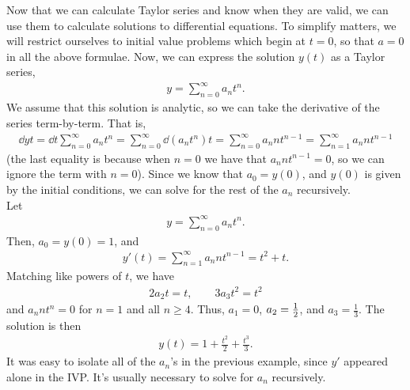 \documentclass{book}
\begin{document}
Now that we can calculate Taylor series and know when they are valid, we
can use them to calculate solutions to differential equations. To simplify
matters, we will restrict ourselves to initial value problems
which begin at $t=0$, so that $a=0$ in all the above formulae. Now, we can
express the solution $y(t)$ as a Taylor series,
\begin{align*}
y = \sum_{n=0}^\infty a_n t^n .
\end{align*}
We assume that this solution is analytic, so we can take the derivative of the
series term-by-term. That is,
\begin{align*}
\dd{y}{t} = \dd{}{t}\sum_{n=0}^\infty a_n t^n
= \sum_{n=0}^\infty \dd{(a_n t^n)}{t} = \sum_{n=0}^\infty a_n n t^{n-1}
= \sum_{n=1}^\infty a_n n t^{n-1}
\end{align*}
(the last equality is because when $n=0$ we have that $a_n n t^{n-1}=0$, so we
can ignore the term with $n=0$). Since we know that $a_0=y(0)$, and $y(0)$ is
given by the initial conditions, we can solve for the rest of the $a_n$
recursively.\\
{
  Let
  \begin{align*}
  y =\sum_{n=0}^\infty a_n t^n.
  \end{align*}
  Then, $a_0=y(0)=1$, and
  \begin{align*}
  y'(t) = \sum_{n=1}^\infty a_n n  t^{n-1} = t^2 +t.
  \end{align*}
  Matching like powers of $t$, we have
  \begin{align*}
  2 a_2 t = t, \qquad 3 a_3 t^2 = t^2
  \end{align*}
  and $a_n n t^n =0$ for $n=1$ and all $n \geq 4$. Thus, $a_1 =0$, $a_2=\frac{1}{2}$,
  and $a_3 = \frac{1}{3}$. The solution is then
  \begin{align*}
  y(t) = 1 +\frac{t^2}{2} +\frac{t^3}{3}.
  \end{align*}
}
It was easy to isolate all of the $a_n$'s in the previous example, since $y'$
appeared alone in the IVP. It's usually necessary to solve for $a_n$
recursively.\\
\end{document}
